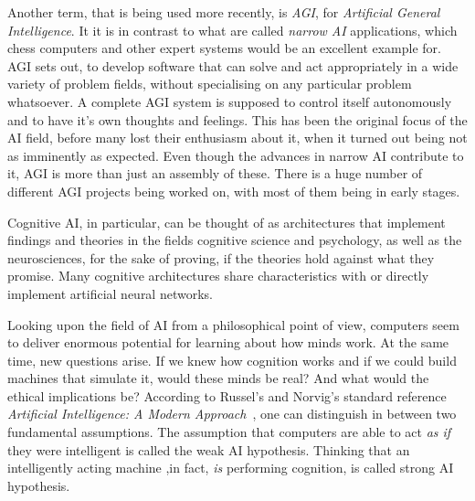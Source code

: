 
Another term, that is being used more recently, is \emph{AGI}, for \emph{Artificial General Intelligence}. It it is in contrast to what are called \emph{narrow AI} applications, which chess computers and other expert systems would be an excellent example for. AGI sets out, to develop software that can solve and act appropriately in a wide variety of problem fields, without specialising on any particular problem whatsoever. A complete AGI system is supposed to control itself autonomously and to have it's own thoughts and feelings. This has been the original focus of the AI field, before many lost their enthusiasm about it, when it turned out being not as imminently as expected. Even though the advances in narrow AI contribute to it, AGI is more than just an assembly of these. There is a huge number of different AGI projects being worked on, with most of them being in early stages.~\cite{goertzel2007artificial}



Cognitive AI, in particular, can be thought of as architectures that implement findings and theories in the fields cognitive science and psychology, as well as the neurosciences, for the sake of proving, if the theories hold against what they promise. Many cognitive architectures share characteristics with or directly implement artificial neural networks.


Looking upon the field of AI from a philosophical point of view, computers seem to deliver enormous potential for learning about how minds work. At the same time, new questions arise. If we knew how cognition works and if we could build machines that simulate it, would these minds be real? And what would the ethical implications be? According to Russel's and Norvig's standard reference \emph{Artificial Intelligence: A Modern Approach}~\cite{russell2009artificial}, one can distinguish in between two fundamental assumptions. The assumption that computers are able to act \emph{as if} they were intelligent is called the weak AI hypothesis. Thinking that an intelligently acting machine ,in fact, \emph{is} performing cognition, is called strong AI hypothesis.


